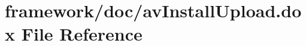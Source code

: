\hypertarget{av_install_upload_8dox}{}\section{framework/doc/av\+Install\+Upload.dox File Reference}
\label{av_install_upload_8dox}
